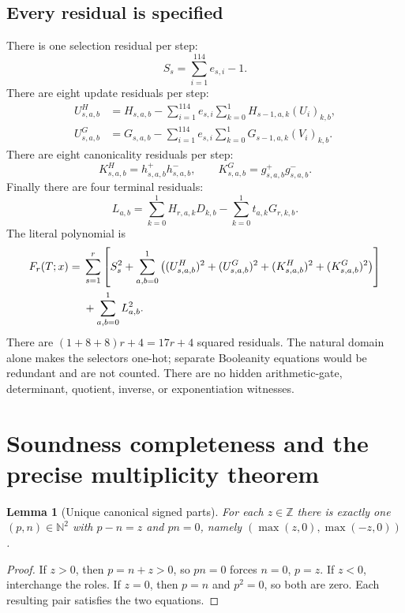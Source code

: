\documentclass[11pt,letterpaper]{article}
\newtheorem{lemma}[theorem]{Lemma}
\theoremstyle{definition}
\theoremstyle{remark}
\newcommand{\Z}{\mathbb Z}
\newcommand{\N}{\mathbb N}
\begin{document}
\subsection{Every residual is specified}
There is one selection residual per step:
\begin{equation}\label{gts:um:eq:select}
 S_s=\sum_{i=1}^{114}e_{s,i}-1.
\end{equation}
There are eight update residuals per step:
\begin{align}
 U^H_{s,a,b}&=H_{s,a,b}-\sum_{i=1}^{114}e_{s,i}
                  \sum_{k=0}^1 H_{s-1,a,k}(U_i)_{k,b},\label{gts:um:eq:updateH}\\
 U^G_{s,a,b}&=G_{s,a,b}-\sum_{i=1}^{114}e_{s,i}
                  \sum_{k=0}^1 G_{s-1,a,k}(V_i)_{k,b}.\label{gts:um:eq:updateG}
\end{align}
There are eight canonicality residuals per step:
\begin{equation}\label{gts:um:eq:complement}
 K^H_{s,a,b}=h^+_{s,a,b}h^-_{s,a,b},\qquad
 K^G_{s,a,b}=g^+_{s,a,b}g^-_{s,a,b}.
\end{equation}
Finally there are four terminal residuals:
\begin{equation}\label{gts:um:eq:terminal}
 L_{a,b}=\sum_{k=0}^1H_{r,a,k}D_{k,b}
                 -\sum_{k=0}^1t_{a,k}G_{r,k,b}.
\end{equation}
The literal polynomial is
\begin{align}\label{gts:um:eq:SOS}
 F_r(T;x)={}&\sum_{s=1}^r\left[S_s^2+
 \sum_{a,b=0}^1\left((U^H_{s,a,b})^2+(U^G_{s,a,b})^2
 +(K^H_{s,a,b})^2+(K^G_{s,a,b})^2\right)\right]\notag\\
 &+\sum_{a,b=0}^1L_{a,b}^2.
\end{align}
There are $(1+8+8)r+4=17r+4$ squared residuals. The natural domain alone makes the selectors one-hot; separate Booleanity equations would be redundant and are not counted. There are no hidden arithmetic-gate, determinant, quotient, inverse, or exponentiation witnesses.

\section{Soundness completeness and the precise multiplicity theorem}
\label{gts:um:sec:bijection}
\begin{lemma}[Unique canonical signed parts]\label{gts:um:lem:canonical}
For each $z\in\Z$ there is exactly one $(p,n)\in\N^2$ with $p-n=z$ and $pn=0$, namely $(\max(z,0),\max(-z,0))$.
\end{lemma}
\begin{proof}
If $z>0$, then $p=n+z>0$, so $pn=0$ forces $n=0$, $p=z$. If $z<0$, interchange the roles. If $z=0$, then $p=n$ and $p^2=0$, so both are zero. Each resulting pair satisfies the two equations.
\end{proof}
\end{document}
